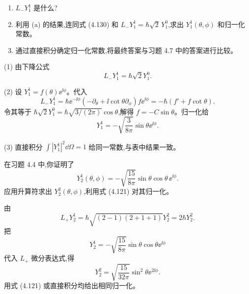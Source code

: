 \begin{question}
\begin{enumerate}
\item $L_-Y_1^1$ 是什么?
\item 利用 (a) 的结果,连同式 (4.130) 和 $L_-Y_1^1=\hbar\sqrt2\,Y_1^0$,求出 $Y_1^1(\theta,\phi)$ 和归一化常数。
\item 通过直接积分确定归一化常数,将最终答案与习题 4.7 中的答案进行比较。
\end{enumerate}

\par\smallskip
{}

\begin{solution}

(1) 由下降公式
\[
L_-Y_1^1=\hbar\sqrt{2}Y_1^0.
\]

(2) 设 $Y_1^1=f(\theta)\ee^{\ii\phi}$。代入
\[
L_-Y_1^1=\hbar \ee^{-\ii\phi}\left(-\partial_\theta+\ii\cot\theta\partial_\phi\right)f \ee^{\ii\phi}
=-\hbar(f'+f\cot\theta).
\]
令其等于 $\hbar\sqrt2Y_1^0=\hbar\sqrt{3/(2\pi)}\cos\theta$,解得 $f=-C\sin\theta$。归一化给
\[
Y_1^1=-\sqrt{\frac{3}{8\pi}}\sin\theta \ee^{\ii\phi}.
\]

(3) 直接积分 $\int|Y_1^1|^2\dd\Omega=1$ 给同一常数,与表中结果一致。

\end{solution}
\end{question}

\begin{question}
在习题 4.4 中,你证明了
\[
Y_2^1(\theta,\phi)=-\sqrt{\frac{15}{8\pi}}\sin\theta\cos\theta\,\ee^{\ii\phi}.
\]
应用升算符求出 $Y_2^2(\theta,\phi)$,利用式 (4.121) 对其归一化。

\par\smallskip
{}

\begin{solution}

由
\[
L_+Y_2^1=\hbar\sqrt{(2-1)(2+1+1)}Y_2^2=2\hbar Y_2^2.
\]
把
\[
Y_2^1=-\sqrt{\frac{15}{8\pi}}\sin\theta\cos\theta \ee^{\ii\phi}
\]
代入 $L_+$ 微分表达式,得
\[
Y_2^2=\sqrt{\frac{15}{32\pi}}\sin^2\theta \ee^{2\ii\phi}.
\]
用式 (4.121) 或直接积分均给出相同归一化。

\end{solution}
\end{question}

